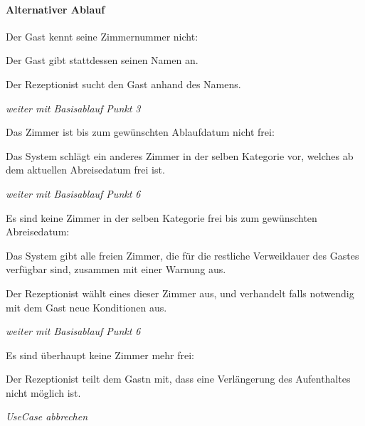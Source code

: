 \paragraph{Alternativer Ablauf}
\begin{longenum}
	\item
	\begin{longenum}
		\item Der \Gls{Gast} kennt seine \Gls{Zimmernummer} nicht:
		\begin{longenum}
			\item Der \Gls{Gast} gibt stattdessen seinen Namen an.
			\item Der \Gls{Rezeptionist} sucht den \Gls{Gast} anhand des Namens.
			\item \emph{weiter mit Basisablauf Punkt 3}
		\end{longenum}
	\end{longenum}
	
	\item
	\item
	\item
	\begin{longenum}
		\item Das \Gls{Zimmer} ist bis zum gewünschten Ablaufdatum nicht frei:
		\begin{longenum}
			\item Das System schlägt ein anderes \Gls{Zimmer} in der selben Kategorie vor, welches ab dem aktuellen Abreisedatum frei ist.
			\item \emph{weiter mit Basisablauf Punkt 6}
		\end{longenum}
		
		\item Es sind keine \Gls{Zimmer} in der selben Kategorie frei bis zum gewünschten Abreisedatum:
		\begin{longenum}
			\item Das System gibt alle freien \Gls{Zimmer}, die für die restliche Verweildauer des \Gls{Gast}es verfügbar sind, zusammen mit einer Warnung aus.
			\item Der \Gls{Rezeptionist} wählt eines dieser Zimmer aus, und verhandelt falls notwendig mit dem \Gls{Gast} neue Konditionen aus.
			\item \emph{weiter mit Basisablauf Punkt 6}
		\end{longenum}
		
		\item Es sind überhaupt keine \Gls{Zimmer} mehr frei:
		\begin{longenum}
			\item Der \Gls{Rezeptionist} teilt dem \Gls{Gast}n mit, dass eine Verlängerung des Aufenthaltes nicht möglich ist.
			\item \emph{UseCase abbrechen}
		\end{longenum}
	\end{longenum}
	
	\item
	\item
\end{longenum}

